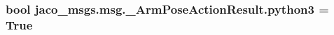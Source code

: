 \subsubsection[{\texorpdfstring{python3}{python3}}]{\setlength{\rightskip}{0pt plus 5cm}bool jaco\+\_\+msgs.\+msg.\+\_\+\+Arm\+Pose\+Action\+Result.\+python3 = True}\hypertarget{namespacejaco__msgs_1_1msg_1_1__ArmPoseActionResult_ab813f43c34cb578abbc452f15ce8d117}{}\label{namespacejaco__msgs_1_1msg_1_1__ArmPoseActionResult_ab813f43c34cb578abbc452f15ce8d117}
